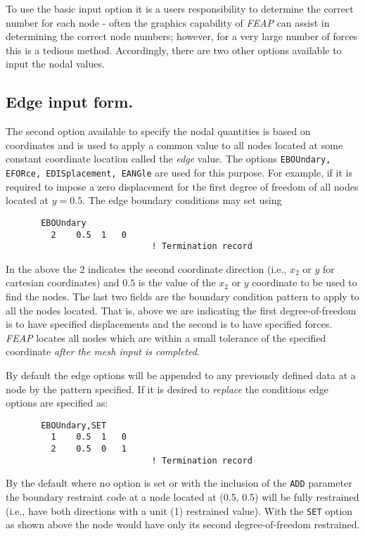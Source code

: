 To use the basic input option
it is a users responsibility to determine the
correct number for each node - often the graphics capability of {\sl FEAP}
can assist in determining the correct node numbers; however, for a very large
number of forces this is a tedious method. Accordingly, there are two other
options available to input the nodal values.

\subsection{Edge input form.}

The second option available to specify the
nodal quantities is based on coordinates and is
used to apply a common value to all nodes located
at some constant coordinate location called the {\it edge} value.
The options {\tt EBOUndary, EFORce, EDISplacement, EANGle}
are used for this purpose.  For example, if it is
required to impose a zero displacement for the first degree of freedom
of all nodes located at $y = 0.5$.
The edge boundary conditions may set using
\begin{verbatim}
       EBOUndary
         2    0.5  1   0
                             ! Termination record
\end{verbatim}
In the above the 2 indicates the second coordinate direction (i.e., $x_2$ or $y$
for cartesian coordinates) and $0.5$ is the value of the $x_2$ or $y$ coordinate
to be used to find the nodes.  The last two fields are the boundary condition
pattern to apply to all the nodes located.  That is, above we are indicating
the first degree-of-freedom is to have specified displacements and the
second is to have specified forces.
{\sl FEAP} locates all nodes which are within a small tolerance of
the specified coordinate {\it after the mesh input is completed}.

By default the edge options will be appended to
any previously defined data at a
node by the pattern specified.  If it is desired to {\it replace} the
conditions edge options are specified as:
\begin{verbatim}
       EBOUndary,SET
         1    0.5  1   0
         2    0.5  0   1
                             ! Termination record
\end{verbatim}
By the default where no option is set or
with the inclusion of the {\tt ADD} parameter the boundary  restraint code
at a node located at (0.5, 0.5) will be fully restrained (i.e., have both
directions with a unit (1) restrained value).  With the {\tt SET} option
as shown above
the node would have only its second degree-of-freedom restrained.


